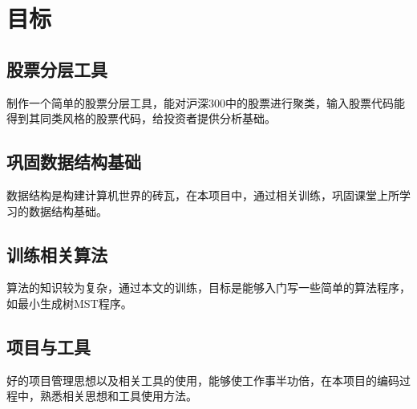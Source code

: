 \section{目标}
\subsection{股票分层工具}
制作一个简单的股票分层工具，能对沪深300中的股票进行聚类，输入股票代码能得到其同类风格的股票代码，给投资者提供分析基础。
\subsection{巩固数据结构基础}
数据结构是构建计算机世界的砖瓦，在本项目中，通过相关训练，巩固课堂上所学习的数据结构基础。
\subsection{训练相关算法}
算法的知识较为复杂，通过本文的训练，目标是能够入门写一些简单的算法程序，如最小生成树MST程序。
\subsection{项目与工具}
好的项目管理思想以及相关工具的使用，能够使工作事半功倍，在本项目的编码过程中，熟悉相关思想和工具使用方法。
